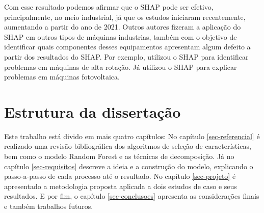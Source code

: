 Com esse resultado podemos afirmar que o SHAP pode ser efetivo, principalmente, no meio industrial, já que os estudos iniciaram recentemente, aumentando a partir do ano de 2021. Outros autores fizeram a aplicação do SHAP em outros tipos de máquinas industrias, também com o objetivo de identificar quais componentes desses equipamentos apresentam algum defeito a partir dos resultados do SHAP. Por exemplo, \cite{brito2022explainable} utilizou o SHAP para identificar problemas em máquinas de alta rotação. Já \cite{utama2023explainable} utilizou o SHAP para explicar problemas em máquinas fotovoltaica.

\section{Estrutura da dissertação}

Este trabalho está divido em mais quatro capítulos: No capítulo \ref{sec-referencial} é realizado uma revisão bibliográfica dos algoritmos de seleção de características, bem como o modelo Random Forest e as técnicas de decomposição. Já no capítulo \ref{sec-requisitos} descreve a ideia e a construção do modelo, explicando o passo-a-passo de cada processo até o resultado. No capítulo \ref{sec-projeto} é apresentado a metodologia proposta aplicada a dois estudos de caso e seus resultados.  E por fim, o capítulo \ref{sec-conclusoes} apresenta as considerações finais e também trabalhos futuros.

